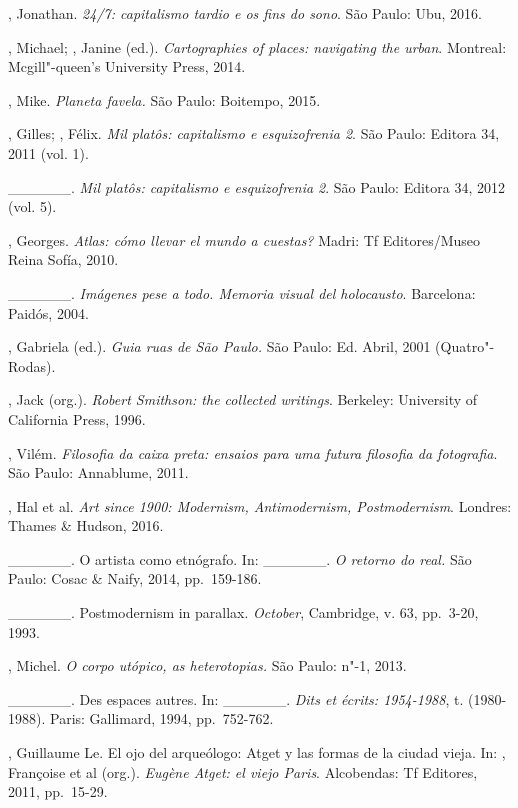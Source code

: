 \begin{Parskip}
, Jonathan. \emph{24/7: capitalismo tardio e os fins do sono}.
São Paulo: Ubu, 2016.

, Michael; , Janine (ed.). \emph{Cartographies of
places: navigating the urban}. Montreal: Mcgill"-queen's University
Press, 2014.

, Mike. \emph{Planeta favela.} São Paulo: Boitempo, 2015.

, Gilles; , Félix. \emph{Mil platôs: capitalismo e
esquizofrenia 2}. São Paulo: Editora 34, 2011 (vol. 1).

\_\_\_\_\_\_. \emph{Mil platôs: capitalismo e esquizofrenia 2}.
São Paulo: Editora 34, 2012 (vol. 5).

, Georges. \emph{Atlas: cómo llevar el mundo a cuestas?}
Madri: Tf Editores/Museo Reina Sofía, 2010.

\_\_\_\_\_\_. \emph{Imágenes pese a todo. Memoria visual del holocausto}. Barcelona: Paidós, 2004.

, Gabriela (ed.). \emph{Guia ruas de São Paulo.} São Paulo: Ed.
Abril, 2001 (Quatro"-Rodas).

, Jack (org.). \emph{Robert Smithson: the collected writings}.
Berkeley: University of California Press, 1996.

, Vilém. \emph{Filosofia da caixa preta: ensaios para uma
futura filosofia da fotografia}. São Paulo: Annablume, 2011.

, Hal et al. \emph{Art since 1900: Modernism, Antimodernism,
Postmodernism}. Londres: Thames \& Hudson, 2016.

\_\_\_\_\_\_. O artista como etnógrafo. In: \_\_\_\_\_\_.
\emph{O retorno do real.} São Paulo: Cosac \& Naify, 2014, pp.~159-186.

\_\_\_\_\_\_. Postmodernism in parallax. \emph{October},
Cambridge, v. 63, pp.~3-20, 1993.

, Michel. \emph{O corpo utópico, as heterotopias.} São Paulo:
n"-1, 2013.

\_\_\_\_\_\_. Des espaces autres. In: \_\_\_\_\_\_. \emph{Dits
et écrits: 1954-1988}, t.  (1980-1988). Paris: Gallimard, 1994, pp.~752-762.

, Guillaume Le. El ojo del arqueólogo: Atget y las formas de la
ciudad vieja. In: , Françoise et al (org.). \emph{Eugène
Atget: el viejo Paris}. Alcobendas: Tf Editores, 2011, pp.~15-29.


\end{Parskip}
